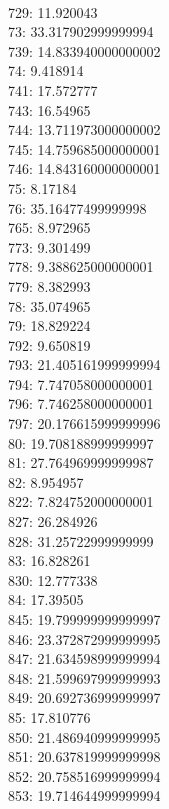 \begin{multicols}{4}
  \\ 729: 11.920043
  \\ 73: 33.317902999999994
  \\ 739: 14.833940000000002
  \\ 74: 9.418914
  \\ 741: 17.572777
  \\ 743: 16.54965
  \\ 744: 13.711973000000002
  \\ 745: 14.759685000000001
  \\ 746: 14.843160000000001
  \\ 75: 8.17184
  \\ 76: 35.16477499999998
  \\ 765: 8.972965
  \\ 773: 9.301499
  \\ 778: 9.388625000000001
  \\ 779: 8.382993
  \\ 78: 35.074965
  \\ 79: 18.829224
  \\ 792: 9.650819
  \\ 793: 21.405161999999994
  \\ 794: 7.747058000000001
  \\ 796: 7.746258000000001
  \\ 797: 20.176615999999996
  \\ 80: 19.708188999999997
  \\ 81: 27.764969999999987
  \\ 82: 8.954957
  \\ 822: 7.824752000000001
  \\ 827: 26.284926
  \\ 828: 31.25722999999999
  \\ 83: 16.828261
  \\ 830: 12.777338
  \\ 84: 17.39505
  \\ 845: 19.799999999999997
  \\ 846: 23.372872999999995
  \\ 847: 21.634598999999994
  \\ 848: 21.599697999999993
  \\ 849: 20.692736999999997
  \\ 85: 17.810776
  \\ 850: 21.486940999999995
  \\ 851: 20.637819999999998
  \\ 852: 20.758516999999994
  \\ 853: 19.714644999999994

\end{multicols}
